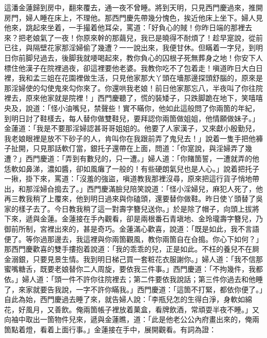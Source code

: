 這潘金蓮歸到房中，翻來覆去，通一夜不曾睡。將到天明，只見西門慶過來，推開房門，婦人睡在床上，不理他。那西門慶先帶幾分愧色，挨近他床上坐下。婦人見他來，跳起來坐着，一手撮着他耳朵，罵道：「好負心的賊！你昨日端的那裡去來？把老娘氣了一夜！你原來幹的那繭兒，我已是曉得不耐煩了！{}趁早寔說，從前已往，與隔壁花家那淫婦偷了幾遭？一一說出來，我便甘休。但瞞着一字兒，到明日你前脚兒過去，後脚我就喓喝起來，教你負心的囚根子死無葬身之地！你安下人標住他漢子在院裡過夜，卻這裡要他老婆。我教你吃不了包着走！嗔道昨日大白日裡，我和孟三姐在花園裡做生活，只見他家那大丫頭在墻那邊探頭舒腦的，原來是那淫婦使的勾使鬼來勾你來了。你還哄我老娘！前日他家那忘八，半夜叫了你往院裡去，原來他家就是院裡！」西門慶聽了，慌的裝矮子，只跌脚跪在地下，笑嘻嘻央及，{}說道：「怪小油嘴兒，禁聲些！實不瞞你，{}他如此這般問了你兩箇的年紀，到明日討了鞋樣去，每人替你做雙鞋兒，要拜認你兩箇做姐姐，他情願做妹子。」金蓮道：「我是不要那淫婦認甚哥哥姐姐的。他要了人家漢子，又來獻小殷勤兒，我老娘眼裡是放不下砂子的人，肯叫你在我跟前弄了鬼兒去！」說着一隻手把他褲子扯開，{}只見那話軟仃當，銀托子還帶在上面，問道：「你寔說，與淫婦弄了幾遭？」西門慶道：「弄到有數兒的，只一遭。」婦人道：「你賭箇誓，{}一遭就弄的他恁軟如鼻涕，濃如醬，卻如風癱了一般的！有些硬朗氣兒也是人心。」說着把托子一揪，掛下來，罵道：「沒羞的強盜，嗔道教我那裡沒尋，原來把這行貨子悄地帶出，和那淫婦㒲搗去了。」{}西門慶滿臉兒陪笑說道：「怪小淫婦兒，麻犯人死了，他再三教我稍了上覆來，他到明日過來與你磕頭，{}還要替你做鞋。昨日使丫頭替了吳家的樣子去了。今日教我稍了這一對壽字簪兒送你。」於是除了帽子，向頭上拔將下來，遞與金蓮。金蓮接在手內觀看，卻是兩根番石青塡地、金玲瓏壽字簪兒，乃御前所制，宮裡出來的，甚是奇巧。金蓮滿心歡喜，說道：「既是如此，我不言語便了。{}等你過那邊去，我這裡與你兩箇觀風，教你兩箇自在㒲搗。你心下如何？」那西門慶歡喜的雙手摟抱着說道：「我的乖乖的兒，正是如此。不枉的養兒不在屙金溺銀，只要見景生情。我到明日梯己買一套粧花衣服謝你。」婦人道：「我不信那蜜嘴糖舌，既要老娘替你二人周旋，要依我三件事。」西門慶道：「不拘幾件，我都依。」婦人道：「頭一件不許你往院裡去；第二件要依我說話；第三件你過去和他睡了，來家就要告我說，一字不許你瞞我。」{}西門慶道：「這箇不打緊，都依你便了。」自此為始，西門慶過去睡了來，就告婦人說：「李瓶兒怎的生得白淨，身軟如綿花，好風月，又善飲。俺兩箇帳子裡放着菓盒，看牌飲酒，常頑耍半夜不睡。」又向袖中取出一箇物件兒來，遞與金蓮瞧，道：「此是他老公公內府畫出來的，俺兩箇點着燈，看着上面行事。」金蓮接在手中，展開觀看。有詞為證：

